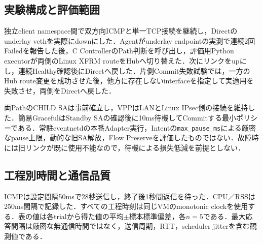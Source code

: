 \documentclass[11pt,a4paper,twoside]{ltjsarticle}
\begin{document}
\subsection{実験構成と評価範囲}

独立client namespace間で双方向ICMPと単一TCP接続を継続し，Directのunderlay vethを実際にdownにした．Agentがunderlay endpointの実測で連続2回Failedを報告した後，C ControllerのPath判断を呼び出し，評価用Python executorが両側のLinux XFRM routeをHubへ切り替えた．次にリンクをupにし，連続Healthy確認後にDirectへ戻した．片側Commit失敗試験では，一方のHub route変更を成功させた後，他方に存在しないinterfaceを指定して実適用を失敗させ，両側をDirectへ戻した．

両PathのCHILD SAは事前確立し，VPPはLANとLinux IPsec側の接続を維持した．簡易GracefulはStandby SAの確認後に10ms待機してCommitする最小ポリシーである．常駐eventnetdの本番Adapter実行，Intentの\texttt{max\_pause\_ms}による厳密なpause上限，動的な旧SA解放，Flow Preserveを評価したものではない．故障時には旧リンクが既に使用不能なので，待機による損失低減を前提としない．

\subsection{工程別時間と通信品質}

ICMPは設定間隔50msで28秒送信し，終了後1秒間返信を待った．CPU／RSSは250ms間隔で記録した．すべての工程時刻は同じVMのmonotonic clockを使用する．表の値は各trialから得た値の平均$\pm$標本標準偏差，各$n=5$である．最大応答間隔は厳密な無通信時間ではなく，送信周期，RTT，scheduler jitterを含む観測値である．
\end{document}

